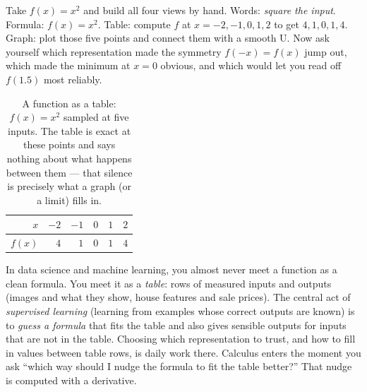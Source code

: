 \begin{labbox}
Take $f(x) = x^2$ and build all four views by hand. Words: \emph{square the
input}. Formula: $f(x)=x^2$. Table: compute $f$ at $x=-2,-1,0,1,2$ to get
$4,1,0,1,4$. Graph: plot those five points and connect them with a smooth U.
Now ask yourself which representation made the symmetry $f(-x)=f(x)$ jump out,
which made the minimum at $x=0$ obvious, and which would let you read off
$f(1.5)$ most reliably.
\end{labbox}
\begin{table}[H]
\centering
\caption{A function as a table: $f(x)=x^2$ sampled at five inputs. The table is
exact at these points and says nothing about what happens between them --- that
silence is precisely what a graph (or a limit) fills in.}
\label{ch02:tab-square}
\begin{tabular}{r r r r r r}
\toprule
$x$    & $-2$ & $-1$ & $0$ & $1$ & $2$ \\
\midrule
$f(x)$ & $4$  & $1$  & $0$ & $1$ & $4$ \\
\bottomrule
\end{tabular}
\end{table}
\begin{applicationbox}
In data science and machine learning, you almost never meet a function as a clean
formula. You meet it as a \emph{table}: rows of measured inputs and outputs (images
and what they show, house features and sale prices). The central act of
\emph{supervised learning} (learning from examples whose correct outputs are
known) is to \emph{guess a formula} that fits the table and also gives sensible
outputs for inputs that are not in the table. Choosing which representation to
trust, and how to fill in values between table rows, is daily work there. Calculus
enters the moment you ask ``which way should I nudge the formula to fit the table
better?'' That nudge is computed with a derivative.
\end{applicationbox}
